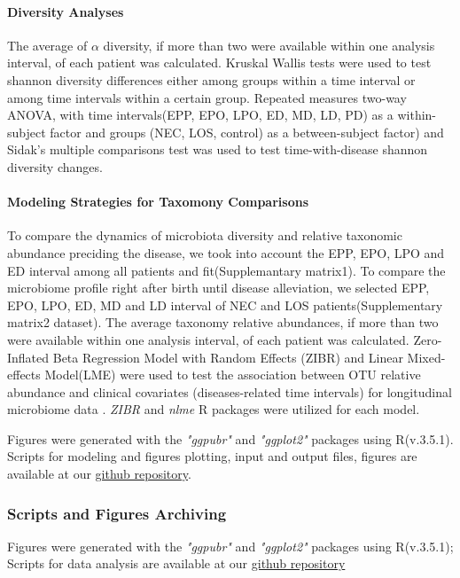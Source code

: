 \documentclass[fleqn,10pt,lineno]{wlpeerj} %
\begin{document}
      \paragraph{Diversity Analyses}
      The average of $\alpha$ diversity, if more than two were available within one analysis interval, of each patient was calculated. Kruskal Wallis tests were used to test shannon diversity differences either among groups within a time interval or among time intervals within a certain group. Repeated measures two-way ANOVA, with time intervals(EPP, EPO, LPO, ED, MD, LD, PD) as a within-subject factor and groups (NEC, LOS, control) as a between-subject factor) and Sidak's multiple comparisons test was used to test time-with-disease shannon diversity changes.
      \paragraph*{Modeling Strategies for Taxomony Comparisons}
      To compare the dynamics of microbiota diversity and relative taxonomic abundance preciding the disease, we took into account the EPP, EPO, LPO and ED interval among all patients and fit(Supplemantary matrix1).
      To compare the microbiome profile right after birth until disease alleviation, we selected EPP, EPO, LPO, ED, MD and LD interval of NEC and LOS patients(Supplementary matrix2 dataset).
      The average taxonomy relative abundances, if more than two were available within one analysis interval, of each patient was calculated.
      Zero-Inflated Beta Regression Model with Random Effects (ZIBR) and Linear Mixed-effects Model(LME) were used to test the association between OTU relative abundance and clinical covariates (diseases-related time intervals) for longitudinal microbiome data \citep{chen2016two}. \textit{ZIBR} and \textit{nlme} R packages were utilized for each model.

      \noindent
      Figures were generated with the \textit{"ggpubr"}\citep{kassambara2017ggpubr} and \textit{"ggplot2"}\citep{ggplot2} packages using R(v.3.5.1).
      Scripts for modeling and figures plotting, input and output files, figures are available at our \href{https://github.com/jiayiliujiayi/NEC-LOS-microbiota_pattern_comparison}{github repository}.

    \subsubsection*{Scripts and Figures Archiving}
    Figures were generated with the \textit{"ggpubr"}\citep{kassambara2017ggpubr} and \textit{"ggplot2"}\citep{ggplot2} packages using R(v.3.5.1); Scripts for data analysis are available at our \href{https://github.com/jiayiliujiayi/NEC-LOS-microbiota_pattern_comparison}{github repository}
\end{document}
